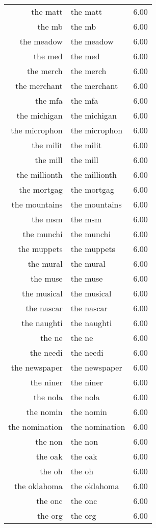 \begin{table}[ht]
\begin{tabular}{rlr}
  the matt & the matt & 6.00 \\ 
  the mb & the mb & 6.00 \\ 
  the meadow & the meadow & 6.00 \\ 
  the med & the med & 6.00 \\ 
  the merch & the merch & 6.00 \\ 
  the merchant & the merchant & 6.00 \\ 
  the mfa & the mfa & 6.00 \\ 
  the michigan & the michigan & 6.00 \\ 
  the microphon & the microphon & 6.00 \\ 
  the milit & the milit & 6.00 \\ 
  the mill & the mill & 6.00 \\ 
  the millionth & the millionth & 6.00 \\ 
  the mortgag & the mortgag & 6.00 \\ 
  the mountains & the mountains & 6.00 \\ 
  the msm & the msm & 6.00 \\ 
  the munchi & the munchi & 6.00 \\ 
  the muppets & the muppets & 6.00 \\ 
  the mural & the mural & 6.00 \\ 
  the muse & the muse & 6.00 \\ 
  the musical & the musical & 6.00 \\ 
  the nascar & the nascar & 6.00 \\ 
  the naughti & the naughti & 6.00 \\ 
  the ne & the ne & 6.00 \\ 
  the needi & the needi & 6.00 \\ 
  the newspaper & the newspaper & 6.00 \\ 
  the niner & the niner & 6.00 \\ 
  the nola & the nola & 6.00 \\ 
  the nomin & the nomin & 6.00 \\ 
  the nomination & the nomination & 6.00 \\ 
  the non & the non & 6.00 \\ 
  the oak & the oak & 6.00 \\ 
  the oh & the oh & 6.00 \\ 
  the oklahoma & the oklahoma & 6.00 \\ 
  the onc & the onc & 6.00 \\ 
  the org & the org & 6.00 \\ 

\end{tabular}
\end{table}

